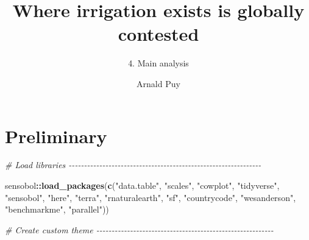 \documentclass[
  11pt,
]{article}
\title{Where irrigation exists is globally contested}
\subtitle{4. Main analysis}
\author{Arnald Puy}
\date{}
\newenvironment{Shaded}{\begin{snugshade}}{\end{snugshade}}
\newcommand{\CommentTok}[1]{\textcolor[rgb]{0.56,0.35,0.01}{\textit{#1}}}
\newcommand{\FunctionTok}[1]{\textcolor[rgb]{0.13,0.29,0.53}{\textbf{#1}}}
\newcommand{\NormalTok}[1]{#1}
\newcommand{\SpecialCharTok}[1]{\textcolor[rgb]{0.81,0.36,0.00}{\textbf{#1}}}
\newcommand{\StringTok}[1]{\textcolor[rgb]{0.31,0.60,0.02}{#1}}
\begin{document}
\maketitle

{
\setcounter{tocdepth}{2}
\tableofcontents
}
\newpage

\section{Preliminary}\label{preliminary}

\begin{Shaded}
\begin{Highlighting}[]
\CommentTok{\# Load libraries {-}{-}{-}{-}{-}{-}{-}{-}{-}{-}{-}{-}{-}{-}{-}{-}{-}{-}{-}{-}{-}{-}{-}{-}{-}{-}{-}{-}{-}{-}{-}{-}{-}{-}{-}{-}{-}{-}{-}{-}{-}{-}{-}{-}{-}{-}{-}{-}{-}{-}{-}{-}{-}{-}{-}{-}{-}{-}{-}{-}{-}{-}{-}}

\NormalTok{sensobol}\SpecialCharTok{::}\FunctionTok{load\_packages}\NormalTok{(}\FunctionTok{c}\NormalTok{(}\StringTok{"data.table"}\NormalTok{, }\StringTok{"scales"}\NormalTok{, }\StringTok{"cowplot"}\NormalTok{, }\StringTok{"tidyverse"}\NormalTok{, }\StringTok{"sensobol"}\NormalTok{,}
                          \StringTok{"here"}\NormalTok{, }\StringTok{"terra"}\NormalTok{, }\StringTok{"rnaturalearth"}\NormalTok{, }\StringTok{"sf"}\NormalTok{, }\StringTok{"countrycode"}\NormalTok{, }
                          \StringTok{"wesanderson"}\NormalTok{, }\StringTok{"benchmarkme"}\NormalTok{, }\StringTok{"parallel"}\NormalTok{))}

\CommentTok{\# Create custom theme {-}{-}{-}{-}{-}{-}{-}{-}{-}{-}{-}{-}{-}{-}{-}{-}{-}{-}{-}{-}{-}{-}{-}{-}{-}{-}{-}{-}{-}{-}{-}{-}{-}{-}{-}{-}{-}{-}{-}{-}{-}{-}{-}{-}{-}{-}{-}{-}{-}{-}{-}{-}{-}{-}{-}{-}{-}{-}}


\end{Highlighting}
\end{Shaded}
\end{document}
